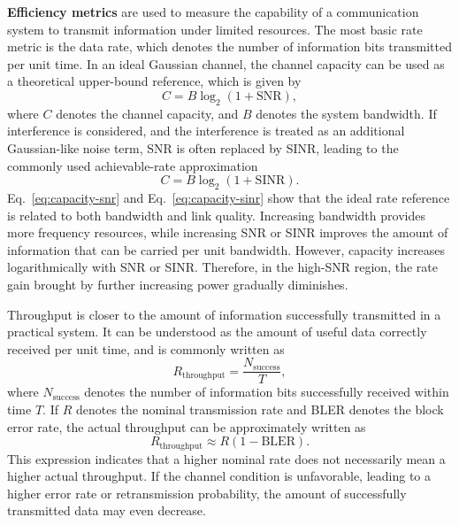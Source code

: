 \textbf{Efficiency metrics} are used to measure the capability of a communication system
to transmit information under limited resources.
The most basic rate metric is the data rate,
which denotes the number of information bits transmitted per unit time.
In an ideal Gaussian channel,
the channel capacity can be used as a theoretical upper-bound reference,
which is given by
\begin{equation}
    C
    =
    B \log_2
    \left(
        1+\mathrm{SNR}
    \right),
    \label{eq:capacity-snr}
\end{equation}
where
\(C\) denotes the channel capacity,
and \(B\) denotes the system bandwidth.
If interference is considered,
and the interference is treated as an additional Gaussian-like noise term,
SNR is often replaced by SINR,
leading to the commonly used achievable-rate approximation
\begin{equation}
    C
    =
    B \log_2
    \left(
        1+\mathrm{SINR}
    \right).
    \label{eq:capacity-sinr}
\end{equation}
Eq.~\eqref{eq:capacity-snr} and Eq.~\eqref{eq:capacity-sinr} show that the ideal rate reference is related to both bandwidth
and link quality.
Increasing bandwidth provides more frequency resources,
while increasing SNR or SINR improves the amount of information that can be carried per unit bandwidth.
However,
capacity increases logarithmically with SNR or SINR.
Therefore,
in the high-SNR region,
the rate gain brought by further increasing power gradually diminishes.

Throughput is closer to the amount of information successfully transmitted in a practical system.
It can be understood as the amount of useful data correctly received per unit time,
and is commonly written as
\begin{equation}
    R_{\mathrm{throughput}}
    =
    \frac{N_{\mathrm{success}}}{T},
    \label{eq:throughput-definition}
\end{equation}
where
\(N_{\mathrm{success}}\) denotes the number of information bits successfully received within time \(T\).
If \(R\) denotes the nominal transmission rate
and BLER denotes the block error rate,
the actual throughput can be approximately written as
\begin{equation}
    R_{\mathrm{throughput}}
    \approx
    R
    \left(
        1-\mathrm{BLER}
    \right).
    \label{eq:throughput-bler}
\end{equation}
This expression indicates that a higher nominal rate does not necessarily mean a higher actual throughput.
If the channel condition is unfavorable,
leading to a higher error rate or retransmission probability,
the amount of successfully transmitted data may even decrease.

